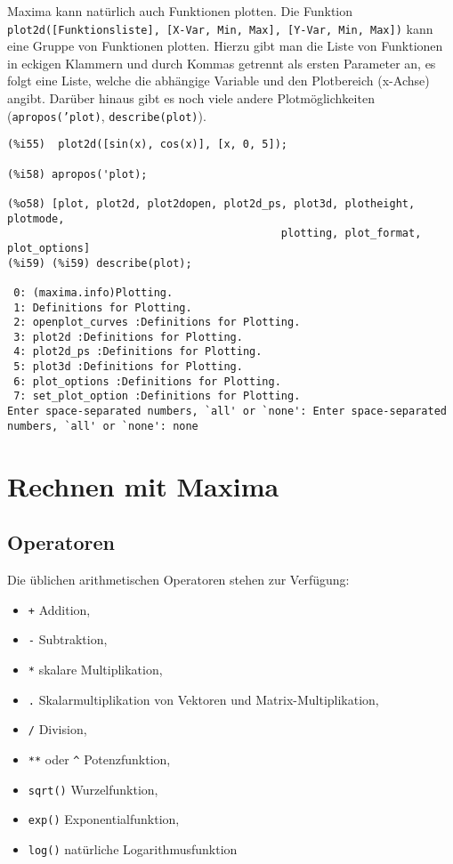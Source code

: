 \documentclass[12pt]{scrartcl}
\begin{document}
Maxima kann natürlich auch Funktionen plotten. Die Funktion
\texttt{plot2d([Funktionsliste], [X-Var, Min, Max], [Y-Var, Min,  Max])}
kann eine Gruppe von Funktionen plotten. Hierzu gibt man die
Liste von Funktionen in eckigen Klammern und durch Kommas getrennt als
ersten Parameter an, es folgt eine Liste, welche die abhängige
Variable und den Plotbereich (x-Achse) angibt. Darüber hinaus gibt es
noch viele andere Plotmöglichkeiten (\texttt{apropos('plot)},
\texttt{describe(plot)}).

\begin{verbatim}
(%i55)  plot2d([sin(x), cos(x)], [x, 0, 5]);

(%i58) apropos('plot);

(%o58) [plot, plot2d, plot2dopen, plot2d_ps, plot3d, plotheight, plotmode,
                                           plotting, plot_format, plot_options]
(%i59) (%i59) describe(plot);

 0: (maxima.info)Plotting.
 1: Definitions for Plotting.
 2: openplot_curves :Definitions for Plotting.
 3: plot2d :Definitions for Plotting.
 4: plot2d_ps :Definitions for Plotting.
 5: plot3d :Definitions for Plotting.
 6: plot_options :Definitions for Plotting.
 7: set_plot_option :Definitions for Plotting.
Enter space-separated numbers, `all' or `none': Enter space-separated numbers, `all' or `none': none
\end{verbatim}

\section{Rechnen mit Maxima}

\subsection{Operatoren}

Die üblichen arithmetischen Operatoren stehen zur Verfügung:

\begin{itemize}
\item \texttt{+} Addition,
\item \texttt{-} Subtraktion,
\item \texttt{*} skalare Multiplikation,
\item \texttt{.} Skalarmultiplikation von Vektoren und Matrix-Multiplikation,
\item \texttt{/} Division,
\item \texttt{**} oder \texttt{\^} Potenzfunktion,
\item \texttt{sqrt()} Wurzelfunktion,
\item \texttt{exp()} Exponentialfunktion,
\item \texttt{log()} natürliche Logarithmusfunktion
\end{itemize}
\end{document}
